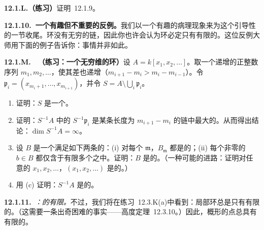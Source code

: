 \textbf{12.1.L.（练习）}\quad 证明\trhProposition{}~12.1.9。

\textbf{12.1.10.\ 一个有趣但不重要的反例。}\quad 我们以一个有趣的病理现象来为这个引导性的一节收尾。\trNoetherian{}环没有无穷的\trPrimeIdeal{}链，因此你也许会认为\trNoetherian{}环必定只有有限的\trDimension。\trNagata{}这位反例大师用下面的例子告诉你：事情并非如此。

\textbf{12.1.M.}\ \extrahard\ \textbf{（练习：一个无穷维的\trNoetherian{}环）}\quad 设 $A=k[x_1,x_2,\dots]$。取一个递增的正整数序列 $m_1,m_2,\dots$，使其差也递增（$m_{i+1}-m_i>m_i-m_{i-1}$）。令 $\mathfrak{p}_i=(x_{m_i+1},\dots,x_{m_{i+1}})$，并令 $S=A\setminus\bigcup_i\mathfrak{p}_i$。
\begin{enumerate}[label=(\alph*)]
\item 证明：$S$ 是一个\trMultiplicativeSubset。
\item 证明：$S^{-1}A$ 中的 $S^{-1}\mathfrak{p}_i$ 是某条长度为 $m_{i+1}-m_i$ 的\trPrimeIdeal{}链中最大的\trPrimeIdeal。从而得出结论：$\dim S^{-1}A=\infty$。
\item 设 $B$ 是一个满足如下两条的\trRing：(i) 对每个\trMaximalIdeal{} $\mathfrak{m}$，$B_{\mathfrak{m}}$ 都是\trNoetherian{}的；(ii) 每个非零的 $b\in B$ 都仅含于有限多个\trMaximalIdeal{}之中。证明：$B$ 是\trNoetherian{}的。（一种可能的进路：证明对任意的 $x_1,x_2,\dots$，$(x_1,x_2,\dots)$ 是\trFinitelyGenerated{}的。）
\item 用 (c) 证明：$S^{-1}A$ 是\trNoetherian{}的。
\end{enumerate}

\textbf{12.1.11.}\ \emph{\trhRemark{}：\trNoetherian\trLocalRing{}的\trDimension{}有限。}\quad 不过，我们将在\mbox{练习~12.3.K(a)}中看到：\trNoetherian{}局部环总是只有有限的\trDimension。（这需要一条出奇困难的事实——\trKrull{}高度定理~12.3.10。）因此，\trLocally\trNoetherian{}概形的点总具有有限的\trCodimension。
